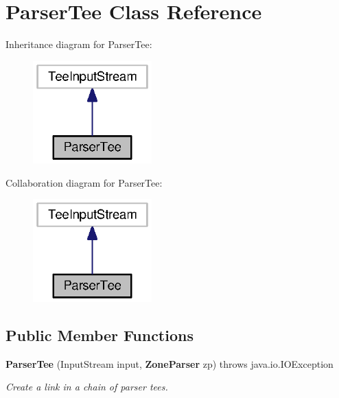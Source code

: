 \section{Parser\+Tee Class Reference}
\label{classorg_1_1smallfoot_1_1parser_1_1ParserTee}


Inheritance diagram for Parser\+Tee\+:\nopagebreak
\begin{figure}[H]
\begin{center}
\leavevmode
\includegraphics[width=130pt]{classorg_1_1smallfoot_1_1parser_1_1ParserTee__inherit__graph}
\end{center}
\end{figure}


Collaboration diagram for Parser\+Tee\+:\nopagebreak
\begin{figure}[H]
\begin{center}
\leavevmode
\includegraphics[width=130pt]{classorg_1_1smallfoot_1_1parser_1_1ParserTee__coll__graph}
\end{center}
\end{figure}
\subsection*{Public Member Functions}
\begin{DoxyCompactItemize}
\item 
{\bf Parser\+Tee} (Input\+Stream input, {\bf Zone\+Parser} zp)  throws java.\+io.\+I\+O\+Exception     
\begin{DoxyCompactList}\small\item\em Create a link in a chain of parser tees. \end{DoxyCompactList}\end{DoxyCompactItemize}
